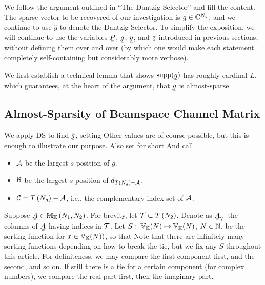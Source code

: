 
We follow the argument outlined in ``The Dantzig Selector'' and fill the content.
The sparse vector to be recovered of our investigation is \(g \in \mathbb{C}^{N_g}\), and we continue to use \(\hat{g}\) to denote the Dantzig Selector.
To simplify the exposition, we will continue to use the variables \(\V{P}\), \(\V{g}\), \(\V{y}\), and \(\V{z}\) introduced in previous sections, without defining them over and over (by which one would make each statement completely self-containing but considerably more verbose).

We first establish a technical lemma that shows \(\RM{supp}(\V{g})\) has roughly cardinal \(L\), which guarantees, at the heart of the argument, that \(\V{g}\) is almost-sparse 

\subsection{Almost-Sparsity of Beamspace Channel Matrix}

We apply DS to find \(\hat{\V{g}}\), setting
Other values are of course possible, but this is enough to illustrate our purpose.
Also set for short
%
%
And call
\begin{itemize}
\item \(\mathcal{A}\) be the largest \(s\) position of \(g\).
\item \(\mathcal{B}\) be the largest \(s\) position of \(d_{T(N_g) -\mathcal{A}}\).
\item \(\mathcal{C} =T \left(  N_g  \right) -\mathcal{A}\), i.e., the complementary index set of \(\mathcal{A}\).
\end{itemize}

Suppose \(\M{A} \in \MB{M}_{\MB{K}} \RB{ N_1, N_2 }\).
For brevity, let \(\mathcal{T} \subset T \left(  N_2  \right)\).
Denote as \(\M{A}_{\MC{T}}\) the columns of \(\M{A}\) having indices in \(\mathcal{T}\).
Let \(S:\; \mathbb{V}_{\mathbb{K}}(N) \mapsto \mathbb{V}_{\mathbb{K}}(N)\), \(N \in \mathbb{N}\), be the sorting function for \(x \in \mathbb{V}_{\mathbb{K}}(N))\), so that
Note that there are infinitely many sorting functions depending on how to break the tie, but we fix any \(S\) throughout this article.
For definiteness, we may compare the first component first, and the second, and so on.
If still there is a tie for a certain component (for complex numbers), we compare the real part first, then the imaginary part.

